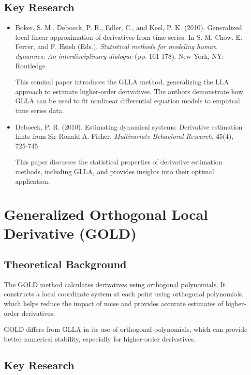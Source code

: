 \documentclass{article}
\begin{document}
\subsection{Key Research}

\begin{itemize}
    \item Boker, S. M., Deboeck, P. R., Edler, C., and Keel, P. K. (2010). Generalized local linear approximation of derivatives from time series. In S. M. Chow, E. Ferrer, and F. Hsieh (Eds.), \textit{Statistical methods for modeling human dynamics: An interdisciplinary dialogue} (pp. 161-178). New York, NY: Routledge.
    
    This seminal paper introduces the GLLA method, generalizing the LLA approach to estimate higher-order derivatives. The authors demonstrate how GLLA can be used to fit nonlinear differential equation models to empirical time series data.
    
    \item Deboeck, P. R. (2010). Estimating dynamical systems: Derivative estimation hints from Sir Ronald A. Fisher. \textit{Multivariate Behavioral Research}, 45(4), 725-745.
    
    This paper discusses the statistical properties of derivative estimation methods, including GLLA, and provides insights into their optimal application.
\end{itemize}

\section{Generalized Orthogonal Local Derivative (GOLD)}

\subsection{Theoretical Background}

The GOLD method calculates derivatives using orthogonal polynomials. It constructs a local coordinate system at each point using orthogonal polynomials, which helps reduce the impact of noise and provides accurate estimates of higher-order derivatives.

GOLD differs from GLLA in its use of orthogonal polynomials, which can provide better numerical stability, especially for higher-order derivatives.

\subsection{Key Research}
\end{document}
